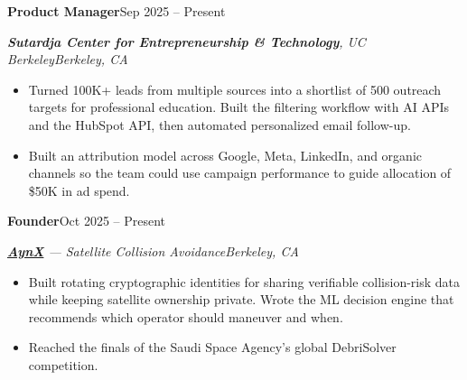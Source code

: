 \documentclass[a4paper,10pt]{article}
\newcommand{\resumeSubheading}[4]{\par\addvspace{3pt}\textbf{#1}\hfill #2\par\textit{#3}\hfill\textit{#4}\par}
\begin{document}
\resumeSubheading{Product Manager}{Sep 2025 -- Present}
{\textbf{Sutardja Center for Entrepreneurship \& Technology}, UC Berkeley}{Berkeley, CA}
\begin{itemize}
\item Turned 100K+ leads from multiple sources into a shortlist of 500 outreach targets for professional education. Built the filtering workflow with AI APIs and the HubSpot API, then automated personalized email follow-up.
\item Built an attribution model across Google, Meta, LinkedIn, and organic channels so the team could use campaign performance to guide allocation of \$50K in ad spend.
\end{itemize}

\resumeSubheading{Founder}{Oct 2025 -- Present}
{\href{https://aynx.space}{\textbf{AynX}} --- Satellite Collision Avoidance}{Berkeley, CA}
\begin{itemize}
\item Built rotating cryptographic identities for sharing verifiable collision-risk data while keeping satellite ownership private. Wrote the ML decision engine that recommends which operator should maneuver and when.
\item Reached the finals of the Saudi Space Agency's global DebriSolver competition.
\end{itemize}
\end{document}
